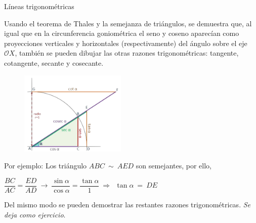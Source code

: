 \begin{myalertblock}{Líneas trigonométricas}
\begin{multicols}{2}
Usando el teorema de Thales y la semejanza de triángulos, se demuestra que, al igual que en la circunferencia goniométrica el seno y coseno aparecían como proyecciones verticales y horizontales (respectivamente) del ángulo sobre el eje $\mathcal OX$, también se pueden dibujar las otras razones trigonométricas: tangente, cotangente, secante y cosecante. 

\begin{figure}[H]
	\centering
	\includegraphics[width=0.45\textwidth]{img-rt/rt10.png}
\end{figure}
\end{multicols}	

Por ejemplo: Los triángulo $ABC \ \sim \ AED$ son semejantes, por ello,

\vspace{2mm} $\dfrac{BC}{AC}=\dfrac{ED}{AD} \ \to \ \dfrac{\sin \alpha}{\cos \alpha}=\dfrac{\tan \alpha}{1} \ \Rightarrow \ \ \tan \alpha\ = \ DE$

\vspace{2mm} Del mismo modo se pueden demostrar las restantes razones trigonométricas. \emph{Se deja como ejercicio}.
\end{myalertblock}

